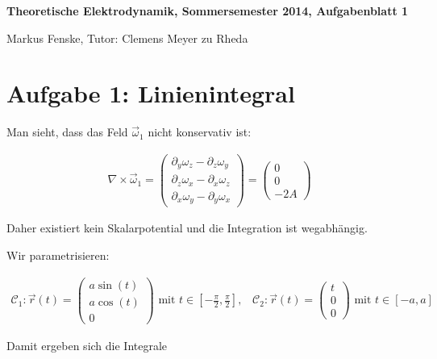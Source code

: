 \documentclass[a4paper,german,12pt,smallheadings]{scrartcl}
\begin{document}
\allowdisplaybreaks %
\begin{center}
\bfseries %
\sffamily %
\vspace{-40pt}
Theoretische Elektrodynamik, Sommersemester 2014, Aufgabenblatt 1

Markus Fenske, Tutor: Clemens Meyer zu Rheda
\vspace{-10pt}
\end{center}

\section*{Aufgabe 1: Linienintegral}

Man sieht, dass das Feld $\vec{\omega}_1$ nicht konservativ ist:

\begin{align*}
  \nabla \times \vec{\omega}_1
= \begin{pmatrix} \partial_y \omega_z - \partial_z \omega_y \\ \partial_z \omega_x - \partial_x \omega_z \\ \partial_x \omega_y - \partial_y \omega_x \end{pmatrix}
= \begin{pmatrix} 0 \\ 0 \\ -2A \end{pmatrix}
\end{align*}

Daher existiert kein Skalarpotential und die Integration ist wegabhängig.

Wir parametrisieren:

\begin{align*}
  \mathcal{C}_1: \vec{r}(t) = \begin{pmatrix} a \sin(t) \\ a \cos(t) \\ 0\end{pmatrix} \text{ mit } t \in \left[-\frac{\pi}{2}, \frac{\pi}{2}\right], \;\;\;
  \mathcal{C}_2: \vec{r}(t) = \begin{pmatrix} t \\ 0 \\ 0\end{pmatrix} \text{ mit } t \in [-a,a]
\end{align*}

Damit ergeben sich die Integrale
\end{document}
